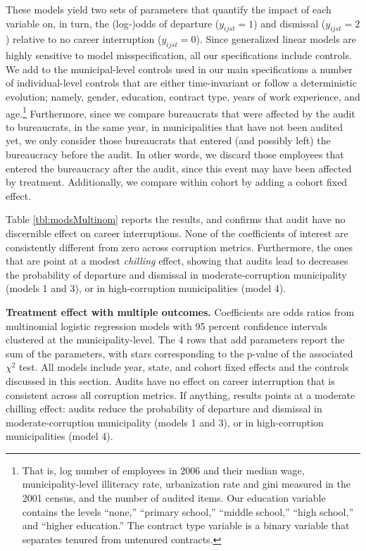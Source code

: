 \documentclass[12pt,a4paper]{article}
\theoremstyle{definition}
\begin{document}
{These models yield two sets of parameters that quantify the impact of each variable on, in turn, the (log-)odds of departure ($y_{ijst} = 1$) and dismissal ($y_{ijst} = 2$) relative to no career interruption ($y_{ijst} = 0$). Since generalized linear models are highly sensitive to model misspecification, all our specifications include controls. We add to the municipal-level controls used in our main specifications a number of individual-level controls that are either time-invariant or follow a deterministic evolution; namely, gender, education, contract type, years of work experience, and age.\footnote{That is, log number of employees in 2006 and their median wage, municipality-level illiteracy rate, urbanization rate and gini measured in the 2001 census, and the number of audited items. Our education variable contains the levels ``none,'' ``primary school,'' ``middle school,'' ``high school,'' and ``higher education.'' The contract type variable is a binary variable that separates tenured from untenured contracts.} Furthermore, since we compare bureaucrats that were affected by the audit to bureaucrats, in the same year, in municipalities that have not been audited yet, we only consider those bureaucrats that entered (and possibly left) the bureaucracy before the audit. In other words, we discard those employees that entered the bureaucracy after the audit, since this event may have been affected by treatment. Additionally, we compare within cohort by adding a cohort fixed effect. 

Table \ref{tbl:modsMultinom} reports the results, and confirms that audit have no discernible effect on career interruptions. None of the coefficients of interest are consistently different from zero across corruption metrics. Furthermore, the ones that are point at a modest \emph{chilling} effect, showing that audits lead to decreases the probability of departure and dismissal in moderate-corruption municipality (models 1 and 3), or in high-corruption municipalities (model 4). 


\begin{table}[H]
    \centering
    \footnotesize
	
	\caption{{\bf Treatment effect with multiple outcomes.} Coefficients are odds ratios from multinomial logistic regression models with 95 percent confidence intervals clustered at the municipality-level. The 4 rows that add parameters report the sum of the parameters, with stars corresponding to the p-value of the associated $\chi^2$ test. All models include year, state, and cohort fixed effects and the controls discussed in this section. Audits have no effect on career interruption that is consistent across all corruption metrics. If anything, results points at a moderate chilling effect: audits reduce the probability of departure and dismissal in moderate-corruption municipality (models 1 and 3), or in high-corruption municipalities (model 4).}
	\label{tbl:modsMultinom}
\end{table}


}
\end{document}

